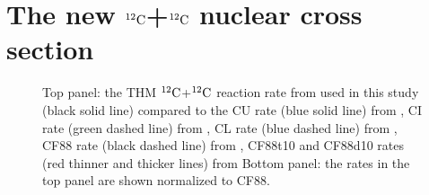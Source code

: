 \documentclass{aastex631}
\newcommand\nuk[2]{$\rm ^{\rm #2} #1$}
\begin{document}
\section{The new \nuk{C}{12}+\nuk{C}{12} nuclear cross section}\label{sec:ncs}

\begin{figure}[ht!]
\caption{Top panel: the THM \nuk{C}{12}+\nuk{C}{12} reaction rate from \citep{thm18} used in this study (black solid line) compared to the CU rate (blue solid line) from \citep{be12,pi13}, CI rate (green dashed line) from \citep{be12}, CL rate (blue dashed line) from \citep{pi13}, CF88 rate (black dashed line) from \citet{cf88}, CF88t10 and CF88d10 rates (red thinner and thicker lines) from \citep{pi13}
Bottom panel: the rates in the top panel are shown normalized to CF88. 
\label{fig:rateratio}}
\end{figure}
\end{document}
